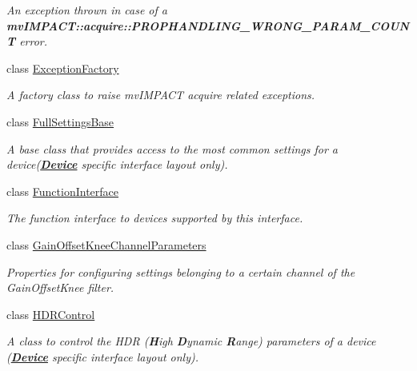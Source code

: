 \begin{DoxyCompactItemize}
\begin{DoxyCompactList}\small\item\em An exception thrown in case of a {\bfseries mv\+I\+M\+P\+A\+C\+T\+::acquire\+::\+P\+R\+O\+P\+H\+A\+N\+D\+L\+I\+N\+G\+\_\+\+W\+R\+O\+N\+G\+\_\+\+P\+A\+R\+A\+M\+\_\+\+C\+O\+U\+N\+T} error. \end{DoxyCompactList}\item 
class \hyperlink{classmv_i_m_p_a_c_t_1_1acquire_1_1_exception_factory}{Exception\+Factory}
\begin{DoxyCompactList}\small\item\em A factory class to raise mv\+I\+M\+P\+A\+C\+T acquire related exceptions. \end{DoxyCompactList}\item 
class \hyperlink{classmv_i_m_p_a_c_t_1_1acquire_1_1_full_settings_base}{Full\+Settings\+Base}
\begin{DoxyCompactList}\small\item\em A base class that provides access to the most common settings for a device({\bfseries \hyperlink{classmv_i_m_p_a_c_t_1_1acquire_1_1_device}{Device}} specific interface layout only). \end{DoxyCompactList}\item 
class \hyperlink{classmv_i_m_p_a_c_t_1_1acquire_1_1_function_interface}{Function\+Interface}
\begin{DoxyCompactList}\small\item\em The function interface to devices supported by this interface. \end{DoxyCompactList}\item 
class \hyperlink{classmv_i_m_p_a_c_t_1_1acquire_1_1_gain_offset_knee_channel_parameters}{Gain\+Offset\+Knee\+Channel\+Parameters}
\begin{DoxyCompactList}\small\item\em Properties for configuring settings belonging to a certain channel of the Gain\+Offset\+Knee filter. \end{DoxyCompactList}\item 
class \hyperlink{classmv_i_m_p_a_c_t_1_1acquire_1_1_h_d_r_control}{H\+D\+R\+Control}
\begin{DoxyCompactList}\small\item\em A class to control the H\+D\+R ({\bfseries H}igh {\bfseries D}ynamic {\bfseries R}ange) parameters of a device ({\bfseries \hyperlink{classmv_i_m_p_a_c_t_1_1acquire_1_1_device}{Device}} specific interface layout only). \end{DoxyCompactList}\item 

\end{DoxyCompactItemize}
